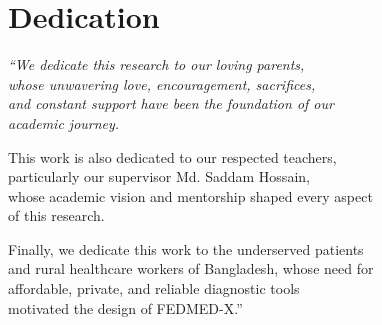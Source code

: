 \chapter*{Dedication}
\vspace{25pt}
\begin{center}
\itshape
``We dedicate this research to our loving parents,\\
whose unwavering love, encouragement, sacrifices,\\
and constant support have been the foundation of our\\
academic journey.

\vspace{14pt}
This work is also dedicated to our respected teachers,\\
particularly our supervisor Md. Saddam Hossain,\\
whose academic vision and mentorship shaped every aspect\\
of this research.

\vspace{14pt}
Finally, we dedicate this work to the underserved patients\\
and rural healthcare workers of Bangladesh, whose need for\\
affordable, private, and reliable diagnostic tools\\
motivated the design of FEDMED-X.''
\end{center}